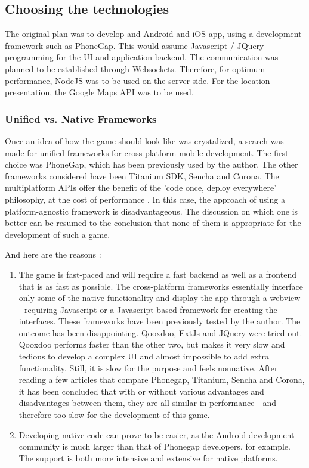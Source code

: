 \subsection{Choosing the technologies}

The original plan was to develop and Android and iOS app, using a development
framework such as PhoneGap. This would assume Javascript / JQuery programming
for the UI and application backend. The communication was planned to be
established through Websockets. Therefore, for optimum performance, NodeJS was
to be used on the server side. For the location presentation, the Google Maps
API was to be used. 

\subsubsection{Unified vs. Native Frameworks}

Once an idea of how the game should look like was crystalized, a search was
made for unified frameworks for cross-platform mobile development. The first
choice was PhoneGap, which has been previously used by the author. The other
frameworks considered have been Titanium SDK, Sencha and Corona. The
multiplatform APIs offer the benefit of the 'code once, deploy everywhere'
philosophy, at the cost of performance \cite{nativevscrossplatform}
\cite{nativevscrossplatform2} \cite{nativevscrossplatform3}.
In this case, the approach of using a platform-agnostic framework is
disadvantageous. The discussion on which one is better can be resumed to the
conclusion that none of them is appropriate for the development of such a
game.\newline

And here are the reasons : 
\begin{enumerate}
  \item The game is fast-paced and will require a fast backend as well as a
  frontend that is as fast as possible. The cross-platform frameworks
  essentially interface only some of the native functionality and display the
  app through a webview - requiring Javascript or a Javascript-based framework
  for creating the interfaces. These frameworks have been previously tested by
  the author. The outcome has been disappointing. Qooxdoo, ExtJs and JQuery were
  tried out. Qooxdoo performs faster than the other two, but makes it very slow
  and tedious to develop a complex UI and almost impossible to add extra
  functionality. Still, it is slow for the purpose and feels nonnative. After
  reading a few articles that compare Phonegap, Titanium, Sencha and Corona, it
  has been concluded that with or without various advantages and disadvantages
  between them, they are all similar in performance - and therefore too slow for
  the development of this game.
  
  \item Developing native code can prove to be easier, as the Android
  development community is much larger than that of Phonegap developers, for
  example. The support is both more intensive and extensive for native
  platforms. 
  
\end{enumerate}


